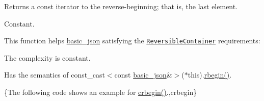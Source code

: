 Returns a const iterator to the reverse-\/beginning; that is, the last element.

  Constant.

This function helps {\ttfamily \hyperlink{classnlohmann_1_1basic__json}{basic\-\_\-json}} satisfying the \href{http://en.cppreference.com/w/cpp/concept/ReversibleContainer}{\tt Reversible\-Container} requirements\-:
\begin{DoxyItemize}
\item The complexity is constant.
\item Has the semantics of {\ttfamily const\-\_\-cast$<$const \hyperlink{classnlohmann_1_1basic__json}{basic\-\_\-json}\&$>$($\ast$this).\hyperlink{classnlohmann_1_1basic__json_a62ccf5b9b3674aec2403fbc02da03db8}{rbegin()}}.
\end{DoxyItemize}

\{The following code shows an example for {\ttfamily \hyperlink{classnlohmann_1_1basic__json_a060b33f8f255986088652625f9d50681}{crbegin()}}.,crbegin\}


